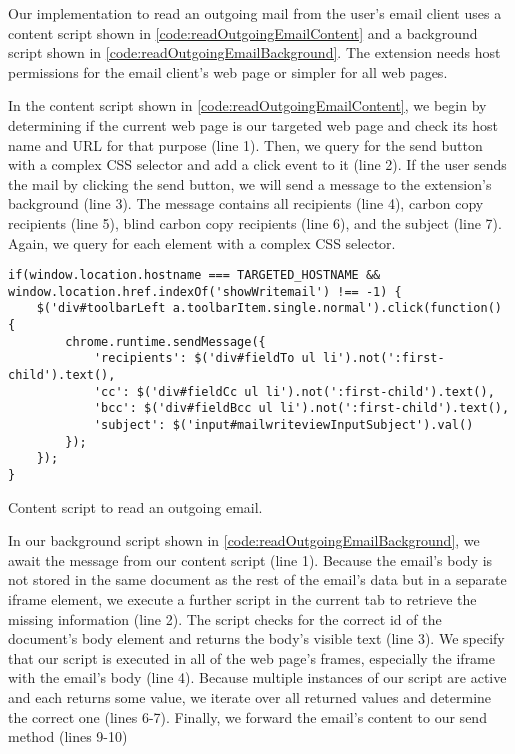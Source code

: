 	Our implementation to read an outgoing mail from the user's email client uses a content script shown in \autoref{code:readOutgoingEmailContent} and a background script shown in \autoref{code:readOutgoingEmailBackground}. The extension needs host permissions for the email client's web page or simpler for all web pages. 
	
	In the content script shown in \autoref{code:readOutgoingEmailContent}, we begin by determining if the current web page is our targeted web page and check its host name and URL for that purpose (line 1). Then, we query for the send button with a complex CSS selector and add a click event to it (line 2). If the user sends the mail by clicking the send button, we will send a message to the extension's background (line 3). The message contains all recipients (line 4), carbon copy recipients (line 5), blind carbon copy recipients (line 6), and the subject (line 7). Again, we query for each element with a complex CSS selector.
	
	\begin{code}
		\begin{lstlisting}
if(window.location.hostname === TARGETED_HOSTNAME && window.location.href.indexOf('showWritemail') !== -1) {
	$('div#toolbarLeft a.toolbarItem.single.normal').click(function() {
		chrome.runtime.sendMessage({
			'recipients': $('div#fieldTo ul li').not(':first-child').text(),
			'cc': $('div#fieldCc ul li').not(':first-child').text(),
			'bcc': $('div#fieldBcc ul li').not(':first-child').text(),
			'subject': $('input#mailwriteviewInputSubject').val()
		});
	});
}
\end{lstlisting}
		\caption{Content script to read an outgoing email.}
		\label{code:readOutgoingEmailContent}
	\end{code}
	
	In our background script shown in \autoref{code:readOutgoingEmailBackground}, we await the message from our content script (line 1). Because the email's body is not stored in the same document as the rest of the email's data but in a separate iframe element, we execute a further script in the current tab to retrieve the missing information (line 2). The script checks for the correct id of the document's body element and returns the body's visible text (line 3). We specify that our script is executed in all of the web page's frames, especially the iframe with the email's body (line 4). Because multiple instances of our script are active and each returns some value, we iterate over all returned values and determine the correct one (lines 6-7). Finally, we forward the email's content to our send method (lines 9-10) 
	
